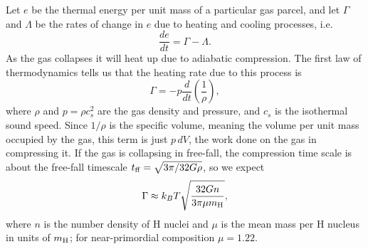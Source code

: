 Let $e$ be the thermal energy per unit mass of a particular gas parcel, and let $\Gamma$ and $\Lambda$ be the rates of change in $e$ due to heating and cooling processes, i.e.
\begin{equation}
\frac{de}{dt} = \Gamma - \Lambda.
\end{equation}
As the gas collapses it will heat up due to adiabatic compression. The first law of thermodynamics tells us that the heating rate due to this process is
\begin{equation}
\label{eq:gamma_ad}
\Gamma = -p \frac{d}{dt}\left(\frac{1}{\rho}\right),
\end{equation}
where $\rho$ and $p=\rho c_s^2$ are the gas density and pressure, and $c_s$ is the isothermal sound speed. Since $1/\rho$ is the specific volume, meaning the volume per unit mass occupied by the gas, this term is just $p\,dV$, the work done on the gas in compressing it. If the gas is collapsing in free-fall, the compression time scale is about the free-fall timescale $t_{\rm ff} = \sqrt{3\pi/32G\rho}$, so we expect
\begin{equation}
\Gamma \approx k_B T \sqrt{\frac{32 G n}{3\pi \mu m_{\rm H}}},
\end{equation}
where $n$ is the number density of H nuclei and $\mu$ is the mean mass per H nucleus in units of $m_{\rm H}$; for near-primordial composition $\mu = 1.22$.

